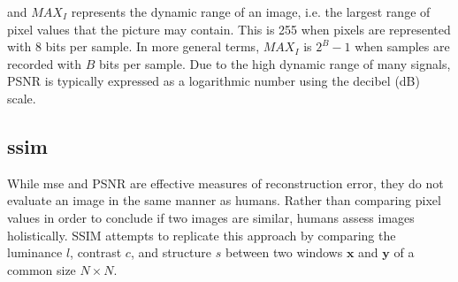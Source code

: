 

and $MAX_I$ represents the dynamic range of an image, i.e. the largest range of pixel values that the picture may contain. This is 255 when pixels are represented with 8 bits per sample. In more general terms, $MAX_I$ is $2^B-1$ when samples are recorded with $B$ bits per sample. Due to the high dynamic range of many signals, PSNR is typically expressed as a logarithmic number using the decibel (dB) scale.


\subsection[SSIM]{\acrfull{ssim}}
While \acrfull{mse} and PSNR are effective measures of reconstruction error, they do not evaluate an image in the same manner as humans. Rather than comparing pixel values in order to conclude if two images are similar, humans assess images holistically. SSIM attempts to replicate this approach by comparing the luminance $l$, contrast $c$, and structure $s$ between two windows $\pmb{x}$ and $\pmb{y}$ of a common size $N \times N$.




\begin{comment}
\begin{itemize}
    \item $\mu$ represents the pixel sample mean for both $x$ and $y$,
    \item $\sigma^2$ represents the variance for both $x$ and $y$,
    \item $\sigma_{xy}$ represents the covariance of x and y,
    \item $c_1 = (k_1L)^2$, $c_2 = (k_2L)^2$ are variables to stabilize the division with weak denominator,
    \item $L$ represents the dynamic range of the pixel-values,
    \item $k_1 = 0.01$, $k_2 = 0.03$ by default   
\end{itemize}
\end{comment}

